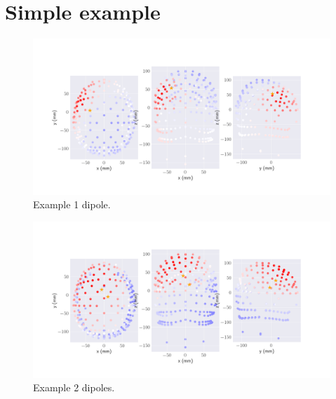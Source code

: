 \documentclass[a4paper, UKenglish, 11pt]{uiomaster}
\begin{document}
\section{Simple example}

\begin{figure}[!htb]
    \centering
    \includegraphics[width=\linewidth]{../Code/plots/finals/eeg_field_1_1.png}
    \caption{Example 1 dipole. }
    \label{fig:eeg_field_1_dipole_example}
\end{figure}

\begin{figure}[!htb]
    \centering
    \includegraphics[width=\linewidth]{../Code/plots/finals/eeg_field_2_2.png}
    \caption{Example 2 dipoles. }
    \label{fig:eeg_field_2_dipole_example}
\end{figure}
\end{document}
